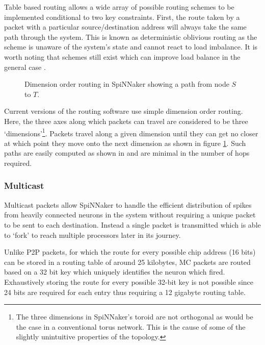				Table based routing allows a wide array of possible routing schemes to
				be implemented conditional to two key constraints. First, the route
				taken by a packet with a particular source/destination address will
				always take the same path through the system. This is known as
				deterministic oblivious routing as the scheme is unaware of the system's
				state and cannot react to load imbalance. It is worth noting that
				schemes still exist which can improve load balance in the general case
				\cite{singh02}.
				
				\begin{figure}
					\center
					
					\caption[Dimension order routing in SpiNNaker.]{Dimension order routing
					in SpiNNaker showing a path from node $S$ to $T$.}
					\label{fig:dimension-order-routing}
				\end{figure}
				
				Current versions of the routing software use simple dimension order
				routing. Here, the three axes along which packets can travel are
				considered to be three `dimensions'\footnote{The three dimensions in
				SpiNNaker's toroid are not orthogonal as would be the case in a
				conventional torus network. This is the cause of some of the slightly
				unintuitive properties of the topology.}. Packets travel along a given
				dimension until they can get no closer at which point they move onto the
				next dimension as shown in figure \ref{fig:dimension-order-routing}.
				Such paths are easily computed as shown in \cite{nocetti02} and are
				minimal in the number of hops required.
			
			\subsubsection{Multicast}
				
				Multicast packets allow SpiNNaker to handle the efficient distribution
				of spikes from heavily connected neurons in the system without requiring
				a unique packet to be sent to each destination. Instead a single packet
				is transmitted which is able to `fork' to reach multiple processors
				later in its journey.
				
				Unlike P2P packets, for which the route for every possible chip address
				(16 bits) can be stored in a routing table of around 25 kilobytes, MC
				packets are routed based on a 32 bit key which uniquely identifies the
				neuron which fired.  Exhaustively storing the route for every possible
				32-bit key is not possible since 24 bits are required for each entry
				thus requiring a 12 gigabyte routing table.
				
